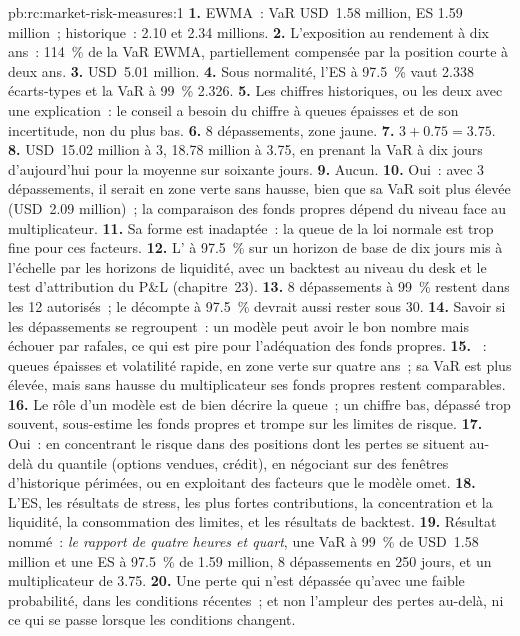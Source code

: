 \begin{solution}{pb:rc:market-risk-measures:1}
\textbf{1.} EWMA~: VaR USD~1.58 million, ES 1.59 million~; historique~: 2.10 et 2.34 millions.
\textbf{2.} L'exposition au rendement à dix ans~: 114~\% de la VaR EWMA, partiellement compensée par la position courte à deux ans.
\textbf{3.} USD~5.01 million.
\textbf{4.} Sous normalité, l'ES à 97.5~\% vaut 2.338 écarts-types et la VaR à 99~\% 2.326.
\textbf{5.} Les chiffres historiques, ou les deux avec une explication~: le conseil a besoin du
chiffre à queues épaisses et de son incertitude, non du plus bas.
\textbf{6.} 8 dépassements, zone jaune.
\textbf{7.} $3+0.75 = 3.75$.
\textbf{8.} USD~15.02 million à 3, 18.78 million à 3.75, en prenant la VaR à dix jours d'aujourd'hui pour la moyenne sur soixante jours.
\textbf{9.} Aucun.
\textbf{10.} Oui~: avec 3 dépassements, il serait en zone verte sans hausse, bien que sa VaR soit plus élevée
(USD~2.09 million)~; la comparaison des fonds propres dépend du niveau face au multiplicateur.
\textbf{11.} Sa forme est inadaptée~: la queue de la loi normale est trop fine pour ces facteurs.
\textbf{12.} L' à 97.5~\% sur un horizon de base de dix jours mis à l'échelle par les horizons de liquidité,
avec un backtest au niveau du desk et le test d'attribution du P\&L (chapitre~23).
\textbf{13.} 8 dépassements à 99~\% restent dans les 12 autorisés~; le décompte à 97.5~\% devrait aussi rester
sous 30.
\textbf{14.} Savoir si les dépassements se regroupent~: un modèle peut avoir le bon nombre mais échouer par rafales,
ce qui est pire pour l'adéquation des fonds propres.
\textbf{15.} ~: queues épaisses et volatilité rapide, en zone verte sur quatre
ans~; sa VaR est plus élevée, mais sans hausse du multiplicateur ses fonds propres restent comparables.
\textbf{16.} Le rôle d'un modèle est de bien décrire la queue~; un chiffre bas, dépassé trop souvent,
sous-estime les fonds propres et trompe sur les limites de risque.
\textbf{17.} Oui~: en concentrant le risque dans des positions dont les pertes se situent au-delà du quantile (options
vendues, crédit), en négociant sur des fenêtres d'historique périmées, ou en exploitant des facteurs que le modèle omet.
\textbf{18.} L'ES, les résultats de stress, les plus fortes contributions, la concentration et la liquidité, la
consommation des limites, et les résultats de backtest.
\textbf{19.} Résultat nommé~: \emph{le rapport de quatre heures et quart}, une VaR à 99~\% de USD~1.58 million et une
ES à 97.5~\% de 1.59 million, 8 dépassements en 250 jours, et un multiplicateur de 3.75.
\textbf{20.} Une perte qui n'est dépassée qu'avec une faible probabilité, dans les conditions récentes~; et non
l'ampleur des pertes au-delà, ni ce qui se passe lorsque les conditions changent.
\end{solution}

